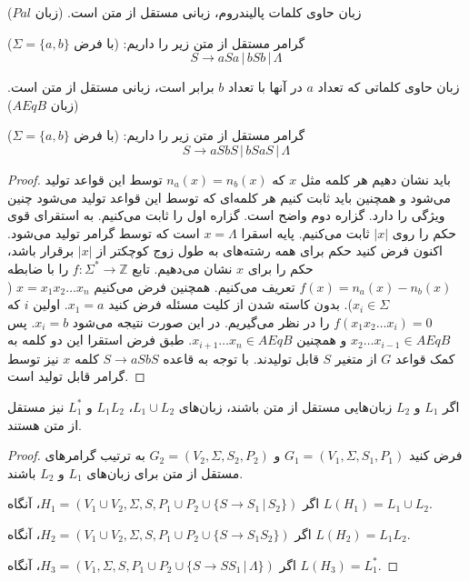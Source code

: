 \documentclass[main.tex]{subfiles}
\begin{document}
	\begin{example}
	زبان حاوی کلمات پالیندروم، زبانی مستقل از متن است. (زبان $ Pal $)
	
	گرامر مستقل از متن زیر را داریم: (با فرض 
	$\Sigma = \{a, b\}$)
	$$S \rightarrow aSa \, | \, bSb \, | \, \Lambda$$
	\end{example}

	\begin{example}
	زبان حاوی کلماتی که تعداد $a$ در آنها با تعداد $b$ برابر است، زبانی مستقل از متن است. (زبان $ AEqB $)
	
	گرامر مستقل از متن زیر را داریم: (با فرض 
	$\Sigma = \{a, b\}$)
	$$S \rightarrow aSbS \, | \, bSaS \, | \, \Lambda$$
	\begin{proof}
		باید نشان دهیم هر کلمه مثل $x$ که 
		$n_a(x) = n_b(x)$
	توسط این قواعد تولید می‌شود و همچنین باید ثابت کنیم هر کلمه‌ای که توسط این قواعد تولید می‌شود چنین ویژگی را دارد. گزاره دوم واضح است. گزاره اول را ثابت می‌کنیم. به استقرای قوی حکم را روی 
	$|x|$
	ثابت می‌کنیم. پایه اسقرا 
	$x = \Lambda$
	است که توسط گرامر تولید می‌شود. اکنون فرض کنید حکم برای همه رشته‌های به طول زوج کوچکتر از $|x|$ برقرار باشد، حکم را برای $x$ نشان می‌دهیم. تابع 
	$f : \Sigma^* \rightarrow \mathbb{Z}$
	را با ضابطه 
	$f(x) = n_a(x) - n_b(x)$
	تعریف می‌کنیم. همچنین فرض می‌کنیم
	$x = x_1x_2\dots x_n$
	($x_i \in \Sigma$). 
	بدون کاسته شدن از کلیت مسئله فرض کنید $x_1 = a$. اولین $i$ که 
	$f(x_1x_2\dots x_i) = 0$
   را در نظر می‌گیریم. در این صورت نتیجه می‌شود $x_i = b$. پس 
   $x_2\dots x_{i-1} \in AEqB$
   و همچنین
   $x_{i+1}\dots x_n \in AEqB$. 
   طبق فرض استقرا این دو کلمه به کمک قواعد $G$ از متغیر $S$ قابل تولیدند. با توجه به قاعده 
   $S \rightarrow aSbS$
   کلمه $x$ نیز توسط گرامر قابل تولید است.
	\end{proof}
	\end{example}

	\begin{theorem}
		اگر $L_1$ و $L_2$ زبان‌هایی مستقل از متن باشند، زبان‌های
		$L_1 \cup L_2$،
		$L_1L_2$
		و
		$L_{1}^*$
		نیز مستقل از متن هستند.
	\end{theorem}

	\begin{proof}
		فرض کنید
		 $G_1 = (V_1, \Sigma, S_1, P_1)$ 
		و
		 $G_2 = (V_2, \Sigma, S_2, P_2)$ 
	به ترتیب گرامر‌های مستقل از متن برای زبان‌های $L_1$ و $L_2$ باشند.
	
	اگر 
		$H_1 = (V_1 \cup V_2, \Sigma, S, P_1 \cup P_2 \cup \{S \rightarrow S_1 \, | \, S_2 \})$،
		آنگاه
		$L(H_1) = L_1 \cup L_2$.
		
		
		اگر
		$H_2 = (V_1 \cup V_2, \Sigma, S, P_1 \cup P_2 \cup \{S \rightarrow S_1S_2 \})$،
		آنگاه
		$L(H_2) = L_1L_2$.
		
		
		اگر
		$H_3 = (V_1, \Sigma, S, P_1 \cup P_2 \cup \{S \rightarrow SS_1 \, | \, \Lambda\})$،
		آنگاه
		$L(H_3) = L_{1}^*$.
	\end{proof}
	
\end{document}
